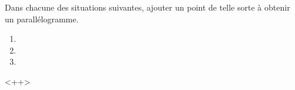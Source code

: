 
\begin{exercice}\label{exo2smath-0169}


    Dans chacune des situations suivantes, ajouter un point de telle sorte à obtenir un parallélogramme.
    \begin{multicols}{2}
    \begin{enumerate}
        \item
   
        \item

\item
   
    \end{enumerate}
    \end{multicols}
    <++>

\end{exercice}
